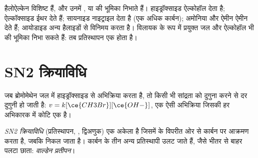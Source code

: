 हैलोऐल्केन विशिष्ट  हैं, और उनमें ,  या
  की भूमिका निभाते हैं। हाइड्रॉक्साइड ऐल्कोहॉल देता है; ऐल्कॉक्साइड
ईथर देते हैं; सायनाइड नाइट्राइल देता है (एक अधिक कार्बन); अमोनिया और ऐमीन
ऐमीन देते हैं; आयोडाइड अन्य हैलाइडों से विनिमय करता है। विलायक के रूप में प्रयुक्त
जल और ऐल्कोहॉल भी  की भूमिका निभा सकते हैं: तब प्रतिस्थापन
एक  होता है।

\section{SN2 क्रियाविधि}

जब ब्रोमोमेथेन जल में हाइड्रॉक्साइड से अभिक्रिया करता है, तो किसी भी
सांद्रता को दुगुना करने से दर दुगुनी हो जाती है: $v = k[\ce{CH3Br}][\ce{OH-}]$, एक ऐसी अभिक्रिया
जिसकी हर अभिकारक में कोटि एक है।

\begin{definition}[SN2 क्रियाविधि, वाल्डेन प्रतीपन]\label{def:b1:nucleophilic-substitution:sn2}
\emph{SN2 क्रियाविधि} (प्रतिस्थापन,
, द्विअणुक) एक अकेला  है जिसमें
  के विपरीत ओर से कार्बन पर आक्रमण करता है,
जबकि  निकल जाता है। कार्बन के तीन अन्य प्रतिस्थापी
उलट जाते हैं, जैसे भीतर से बाहर पलटा छाता: \emph{वाल्डेन
प्रतीपन}।
\end{definition}


